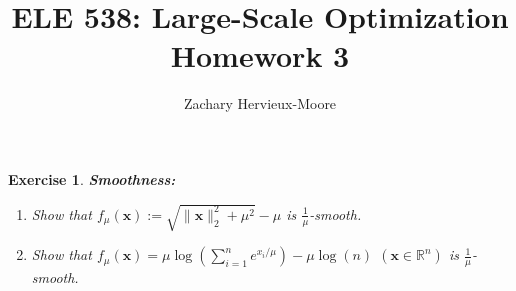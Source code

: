 \documentclass[12pt]{article}
\title{ELE 538: Large-Scale Optimization \\ Homework 3}
\author{Zachary Hervieux-Moore}
\date{\displaydate{date}}
\theoremstyle{colon}
\newtheorem{exercise}{Exercise}
\begin{document}
\maketitle

\clearpage

\begin{exercise}
	\textbf{Smoothness:}
	\begin{enumerate}[label=\alph*)]
		\item Show that $f_\mu (\bm{x}) := \sqrt{\lVert \bm{x} \rVert_2^2 + \mu^2} - \mu$ is $\frac{1}{\mu}$-smooth.
		\item Show that $f_\mu (\bm{x}) = \mu \log(\sum_{i=1}^n e^{x_i/\mu}) - \mu \log(n)$ $(\bm{x} \in \mathbb{R}^n)$ is $\frac{1}{\mu}$-smooth.
	\end{enumerate}
\end{exercise}
\end{document}
